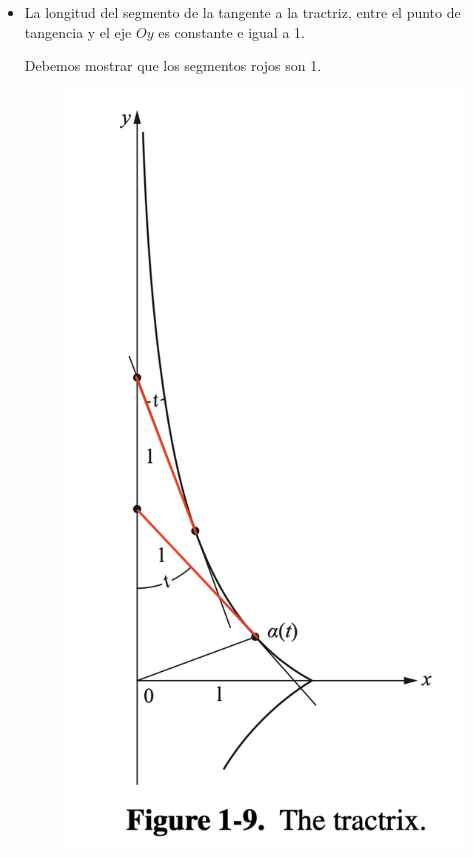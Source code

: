 \begin{problema}
\begin{itemize}
\begin{sol}
    \end{sol}
    \item La longitud del segmento de la tangente a la tractriz, entre el punto de tangencia y el eje $O y$ es constante e igual a 1.
    \begin{sol}
        Debemos mostrar que los segmentos rojos son 1. 
        \begin{figure}[H]
            \centering
            \includegraphics[scale=0.5]{Problemas/tractrix.png}
        \end{figure}


\end{sol}
\end{itemize}
\end{problema}
